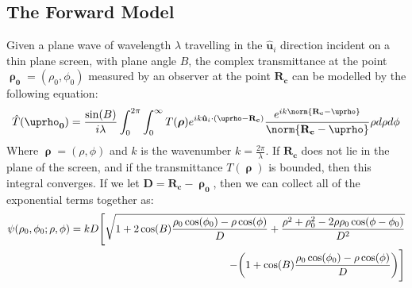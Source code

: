\documentclass[crop=false,class=book,oneside]{standalone}
\begin{document}
        \subsection{The Forward Model}
            Given a plane wave of wavelength $\lambda$
            travelling in the $\mathbf{\hat{u}}_{i}$ direction
            incident on a thin plane screen, with plane angle $B$,
            the complex transmittance at the point
            $\boldsymbol{\uprho_{0}}=(\rho_{0},\phi_{0})$ measured
            by an observer at the point $\mathbf{R_{c}}$ can be
            modelled by the following equation:
            \begin{equation}
                \hat{T}(\boldsymbol{\uprho_{0}})
                =\frac{\sin(B)}
                      {i\lambda}
                \int_{0}^{2\pi}\int_{0}^{\infty}
                    T(\boldsymbol{\rho})
                    e^{%
                        ik\mathbf{\hat{u}}_{i}\cdot
                        (\boldsymbol{\uprho}-\mathbf{R_{c}})
                    }
                    \frac{%
                        e^{%
                            ik\norm{%
                                \mathbf{R_{c}}
                                -\boldsymbol{\uprho}
                            }
                        }
                    }{%
                        \norm{%
                            \mathbf{R_{c}}
                            -\boldsymbol{\uprho}
                        }
                    }
                    \rho{d}\rho{d}\phi
            \end{equation}
            Where $\boldsymbol{\uprho}=(\rho,\phi)$ and $k$
            is the wavenumber $k=\frac{2\pi}{\lambda}$. If
            $\mathbf{R_{c}}$ does not lie in the plane of the
            screen, and if the transmittance
            $T(\boldsymbol{\uprho})$ is bounded, then this
            integral converges. If we let
            $\mathbf{D}=\mathbf{R_{c}}-\boldsymbol{\uprho_{0}}$,
            then we can collect all of the exponential terms
            together as:
            \begin{equation}
                \begin{split}
                    \psi(\rho_{0},\phi_{0};\rho,\phi)
                    =kD\Bigg[%
                        \sqrt{1+2\cos(B)
                        \frac{%
                            \rho_{0}\cos(\phi_{0})
                            -\rho\cos(\phi)
                        }{D}
                        +\frac{%
                            \rho^{2}+\rho_{0}^{2}
                            -2\rho\rho_{0}\cos(\phi-\phi_{0})
                        }{D^2}}\\
                        -\bigg(
                            1+\cos(B)
                            \frac{%
                                \rho_{0}\cos(\phi_{0})
                                -\rho\cos(\phi)
                            }{D}
                        \bigg)
                    \Bigg]
                \end{split}
            \end{equation}
\end{document}

